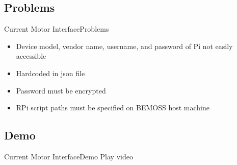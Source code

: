 \documentclass{beamer}
\begin{document}
\subsection{Problems}

\begin{frame}{Current Motor Interface}{Problems}
	\begin{itemize}
		\item Device model, vendor name, username, and password of Pi not easily accessible
		\item Hardcoded in json file
		\item Password must be encrypted 
		\item RPi script paths must be specified on BEMOSS host machine
	\end{itemize}
\end{frame}

\subsection{Demo}

\begin{frame}{Current Motor Interface}{Demo}
\center
Play video
\end{frame}
\end{document}
